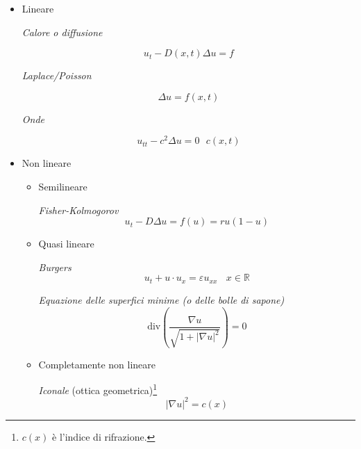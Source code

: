 \documentclass[10pt,a4paper,twoside,openright]{book}
\begin{document}
\begin{itemize}
    \item Lineare

          \textit{Calore o diffusione}

          \begin{equation*}
              u_{t} -D(x,t) \Delta u=f
          \end{equation*}

          \textit{Laplace/Poisson}

          \begin{equation*}
              \Delta u=f(x,t)
          \end{equation*}

          \textit{Onde}

          \begin{equation*}
              u_{tt} -c^{2} \Delta u=0\ \ \ c(x,t)
          \end{equation*}
    \item Non lineare
          \begin{itemize}
              \item Semilineare

                    \textit{Fisher-Kolmogorov}
                    \begin{equation*}
                        u_{t} -D\Delta u=f(u) =ru(1-u)
                    \end{equation*}
              \item Quasi lineare

                    \textit{Burgers}
                    \begin{equation*}
                        u_{t} +u\cdotp u_{x} =\varepsilon u_{xx} \ \ \ \ x\in \mathbb{R}
                    \end{equation*}

                    \textit{Equazione delle superfici minime (o delle bolle di sapone)}
                    \begin{equation*}
                        \mathrm{div}\left(\frac{\nabla u}{\sqrt{1+| \nabla u| ^{2}}}\right) =0
                    \end{equation*}
              \item Completamente non lineare

                    \textit{Iconale} (ottica geometrica)\footnote{$c(x)$ è l'indice di rifrazione.}
                    \begin{equation*}
                        | \nabla u| ^{2} =c(x)
                    \end{equation*}


\end{itemize}
\end{itemize}
\end{document}

